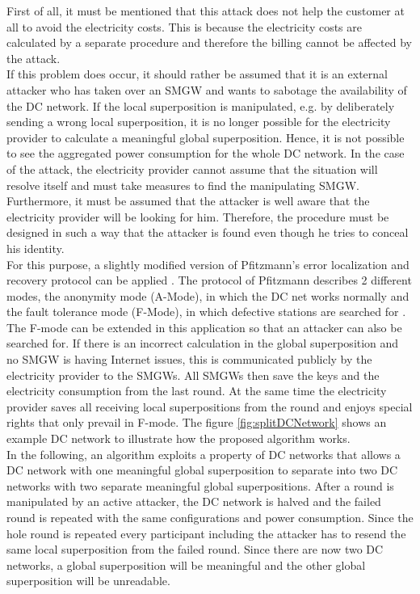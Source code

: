 First of all, it must be mentioned that this attack does not help the customer at all to avoid the electricity costs. This is because the electricity costs are calculated by a separate procedure and therefore the billing cannot be affected by the attack.\\ If this problem does occur, it should rather be assumed that it is an external attacker who has taken over an \gls{SMGW} and wants to sabotage the availability of the DC network.
If the local superposition is manipulated, e.g. by deliberately sending a wrong local superposition, it is no longer possible for the electricity provider to calculate a meaningful global superposition. Hence, it is not possible to see the aggregated power consumption for the whole DC network. In the case of the attack, the electricity provider cannot assume that the situation will resolve itself and must take measures to find the manipulating \gls{SMGW}. Furthermore, it must be assumed that the attacker is well aware that the electricity provider will be looking for him. Therefore, the procedure must be designed in such a way that the attacker is found even though he tries to conceal his identity.\\
For this purpose, a slightly modified version of Pfitzmann's error localization and recovery protocol can be applied \cite{pfitzmann2006security}. The protocol of Pfitzmann describes 2 different modes, the anonymity mode (A-Mode), in which the DC net works normally and the fault tolerance mode (F-Mode), in which defective stations are searched for .
The F-mode can be extended in this application so that an attacker can also be searched for. If there is an incorrect calculation in the global superposition and no \gls{SMGW} is having Internet issues, this is communicated publicly by the electricity provider to the \gls{SMGW}s. All \gls{SMGW}s then save the keys and the electricity consumption from the last round. At the same time the electricity provider saves all receiving local superpositions from the round and enjoys special rights that only prevail in F-mode. The figure \ref{fig:splitDCNetwork} shows an example DC network to illustrate how the proposed algorithm works.\\
In the following, an algorithm exploits a property of DC networks that allows a DC network with one meaningful global superposition to separate into two DC networks with two separate meaningful global superpositions.
After a round is manipulated by an active attacker, the DC network is halved and the failed round is repeated with the same configurations and power consumption. Since the hole round is repeated every participant including the attacker has to resend the same local superposition from the failed round. Since there are now two DC networks, a global superposition will be meaningful and the other global superposition will be unreadable. 
